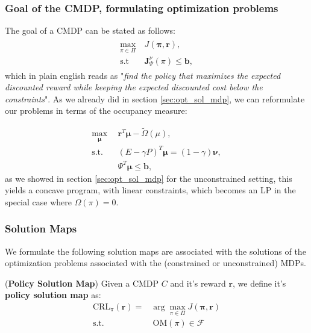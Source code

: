 \subsubsection{Goal of the CMDP, formulating optimization problems}

The goal of a CMDP can be stated as follows:
\begin{align}
    \begin{aligned}
    \max_{\pi \in \Pi} & ~ J(\bm{\pi},\bm{r}), \\
    \text{s.t} & ~ \bm{J}_\Psi^\nu(\pi)\leq \bm{b},
    \end{aligned}
    \label{eq:pb_constrained_direct_policy_opt}
\end{align}
which in plain english reads as "\textit{find the policy that maximizes the expected discounted reward while keeping the expected discounted cost below the constraints}". As we already did in section \ref{sec:opt_sol_mdp}, we can reformulate our problems in terms of the occupancy measure:

\begin{equation}
    \begin{aligned}
        \max_{\bm{\mu}} & ~~ \bm{r}^T\bm{\bm{\mu}}-\tilde{\Omega}(\mu), \\
        \text{s.t.} & ~~  (E-\gamma P)^T  \bm{\mu} = (1-\gamma) \bm{\nu}, \\
                    & ~~  \Psi^T \bm{\mu} \leq \bm{b},
    \end{aligned}
    \label{eq:pb_constrained_occupancy_opt}
\end{equation}
as we showed in section \ref{sec:opt_sol_mdp} for the unconstrained setting, this yields a concave program, with linear constraints, which becomes an LP in the special case where $\Omega(\pi) = 0$.

\subsubsection{Solution Maps}

We formulate the following solution maps are associated with the solutions of the optimization problems associated with the (constrained or unconstrained) MDPs.

\begin{definition}
    \label{def:policy_solmap}
    (\textbf{Policy Solution Map})
    Given a CMDP $\textit{C}$ and it's reward $\bm{r}$, we define it's \textbf{policy solution map} as:
    \begin{align*}
        \text{CRL}_{\pi}(\bm{r}) = &\arg \max_{\pi\in \Pi}  J(\bm{\pi},\bm{r }) \\
        \text{s.t.} & ~ \text{OM}(\pi) \in \mathcal{F}
    \end{align*}
\end{definition}

